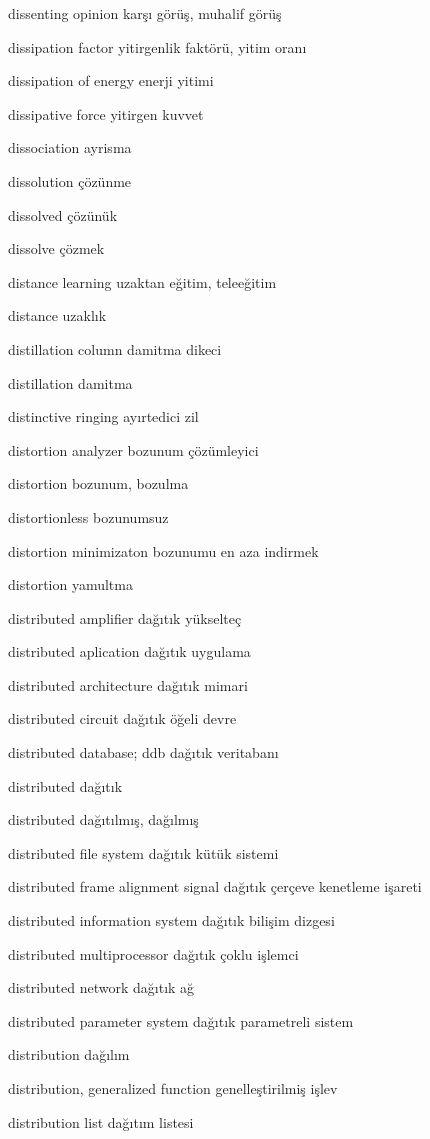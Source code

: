 \documentclass[12pt,fleqn]{article}\usepackage{../../common}
\begin{document}
dissenting opinion karşı görüş, muhalif görüş

dissipation factor yitirgenlik faktörü, yitim oranı

dissipation of energy enerji yitimi

dissipative force yitirgen kuvvet

dissociation ayrisma

dissolution çözünme

dissolved çözünük

dissolve çözmek

distance learning uzaktan eğitim, teleeğitim

distance uzaklık

distillation column damitma dikeci

distillation damitma

distinctive ringing ayırtedici zil

distortion analyzer bozunum çözümleyici

distortion bozunum, bozulma

distortionless bozunumsuz

distortion minimizaton bozunumu en aza indirmek

distortion yamultma

distributed amplifier dağıtık yükselteç

distributed aplication dağıtık uygulama

distributed architecture dağıtık mimari

distributed circuit dağıtık öğeli devre

distributed database; ddb dağıtık veritabanı

distributed dağıtık

distributed dağıtılmış, dağılmış

distributed file system dağıtık kütük sistemi

distributed frame alignment signal dağıtık çerçeve kenetleme işareti

distributed information system dağıtık bilişim dizgesi

distributed multiprocessor dağıtık çoklu işlemci

distributed network dağıtık ağ

distributed parameter system dağıtık parametreli sistem

distribution dağılım

distribution, generalized function genelleştirilmiş işlev

distribution list dağıtım listesi
\end{document}
